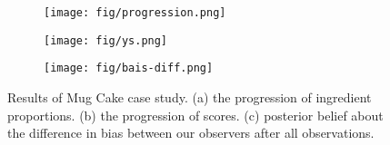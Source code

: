 \begin{figure}
    \centering
    \begin{subfigure}[b]{0.31\textwidth}
        \centering
        \texttt{[image: fig/progression.png]}
        \caption{}
        \label{subfig:exp:progression}
    \end{subfigure}
    \hfill
    \begin{subfigure}[b]{0.31\textwidth}
        \centering
        \texttt{[image: fig/ys.png]}
        \caption{}
        \label{subfig:exp:ys}
    \end{subfigure}
    \hfill
    \begin{subfigure}[b]{0.31\textwidth}
        \centering
        \texttt{[image: fig/bais-diff.png]}
        \caption{}
        \label{subfig:exp:bias-diff}
    \end{subfigure}
    \hfill
    \caption{
        Results of Mug Cake case study.
        (a) the progression of ingredient proportions.
        (b) the progression of scores.
        (c) posterior belief about the difference in bias between our observers after all observations.
    }
    \label{fig:exp-res}
\end{figure}
